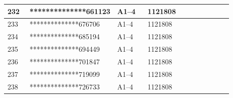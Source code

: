 \documentclass[UTF8,10pt,a4paper,fontset=fandol]{ctexart}
\newcommand{\fieldvalue}[1]{#1}
\begin{document}
\begin{center}
\begin{tabular}{|p{0.10\linewidth}|p{0.25\linewidth}|p{0.14\linewidth}|p{0.24\linewidth}|p{0.16\linewidth}|}
\fieldvalue{232} &
\fieldvalue{**************661123} &
\fieldvalue{A1--4} &
\fieldvalue{1121808} & \\ \hline

\fieldvalue{233} &
\fieldvalue{**************676706} &
\fieldvalue{A1--4} &
\fieldvalue{1121808} & \\ \hline

\fieldvalue{234} &
\fieldvalue{**************685194} &
\fieldvalue{A1--4} &
\fieldvalue{1121808} & \\ \hline

\fieldvalue{235} &
\fieldvalue{**************694449} &
\fieldvalue{A1--4} &
\fieldvalue{1121808} & \\ \hline

\fieldvalue{236} &
\fieldvalue{**************701847} &
\fieldvalue{A1--4} &
\fieldvalue{1121808} & \\ \hline

\fieldvalue{237} &
\fieldvalue{**************719099} &
\fieldvalue{A1--4} &
\fieldvalue{1121808} & \\ \hline

\fieldvalue{238} &
\fieldvalue{**************726733} &
\fieldvalue{A1--4} &
\fieldvalue{1121808} & \\ \hline


\end{tabular}
\end{center}
\end{document}
